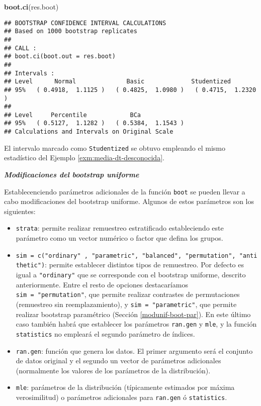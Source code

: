 \documentclass[
]{book}
\newenvironment{Shaded}{\begin{snugshade}}{\end{snugshade}}
\newcommand{\KeywordTok}[1]{\textcolor[rgb]{0.13,0.29,0.53}{\textbf{#1}}}
\newcommand{\NormalTok}[1]{#1}
\theoremstyle{break}
\theoremstyle{definition}
\theoremstyle{definition}
\theoremstyle{definition}
\theoremstyle{remark}
\begin{document}
\begin{Shaded}
\begin{Highlighting}[]
\KeywordTok{boot.ci}\NormalTok{(res.boot)}
\end{Highlighting}
\end{Shaded}

\begin{verbatim}
## BOOTSTRAP CONFIDENCE INTERVAL CALCULATIONS
## Based on 1000 bootstrap replicates
## 
## CALL : 
## boot.ci(boot.out = res.boot)
## 
## Intervals : 
## Level      Normal              Basic             Studentized     
## 95%   ( 0.4918,  1.1125 )   ( 0.4825,  1.0980 )   ( 0.4715,  1.2320 )  
## 
## Level     Percentile            BCa          
## 95%   ( 0.5127,  1.1282 )   ( 0.5384,  1.1543 )  
## Calculations and Intervals on Original Scale
\end{verbatim}

El intervalo marcado como \texttt{Studentized} se obtuvo empleando el mismo estadístico
del Ejemplo \ref{exm:media-dt-desconocida}.

\textbf{\emph{Modificaciones del bootstrap uniforme}}

Establecenciendo parámetros adicionales de la función \texttt{boot} se pueden llevar
a cabo modificaciones del bootstrap uniforme.
Algunos de estos parámetros son los siguientes:

\begin{itemize}
\item
  \texttt{strata}: permite realizar remuestreo estratificado estableciendo este parámetro
  como un vector numérico o factor que defina los grupos.
\item
  \texttt{sim\ =\ c("ordinary"\ ,\ "parametric",\ "balanced",\ "permutation",\ "antithetic")}:
  permite establecer distintos tipos de remuestreo.
  Por defecto es igual a \texttt{"ordinary"} que se corresponde con el bootstrap uniforme,
  descrito anteriormente. Entre el resto de opciones destacaríamos
  \texttt{sim\ =\ "permutation"}, que permite realizar contrastes de
  permutaciones (remuestreo sin reemplazamiento), y \texttt{sim\ =\ "parametric"},
  que permite realizar bootstrap paramétrico (Sección \ref{modunif-boot-par}).
  En este último caso también habrá que establecer los parámetros \texttt{ran.gen} y
  \texttt{mle}, y la función \texttt{statistics} no empleará el segundo parámetro de índices.
\item
  \texttt{ran.gen}: función que genera los datos. El primer argumento será el conjunto de datos
  original y el segundo un vector de parámetros adicionales
  (normalmente los valores de los parámetros de la distribución).
\item
  \texttt{mle}: parámetros de la distribución (típicamente estimados por máxima verosimilitud)
  o parámetros adicionales para \texttt{ran.gen} ó \texttt{statistics}.
\end{itemize}
\end{document}
